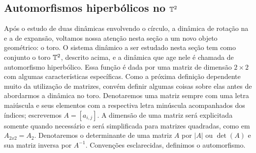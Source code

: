 \begin{comment}
Vamos agora mostrar que vale a relação comutativa $\phi \circ f = \sigma \circ \phi$. Seja $x \in F$ e $\phi(x) = (x_n)_{n \in \Z}$. Nesse caso, sabemos que $x \in R_{(x_n)_{n \in \Z}}$. Aplicando $f$ a $R_{(x_n)}$, temos
	\begin{align*}
	f(R_{(x_n)_{n \in \Z}}) &= f\left( \bigcap_{i \in \Z}f^i(R_{x_i})\right) \\
				&= \bigcap_{i \in \Z}f^{i+1}(R_{x_i}) \\
				&= \bigcap_{i \in \Z}f^i(R_{x_{i-1}}) \\
				&= R_{(x_{n-1})_{n \in \Z}}.
	\end{align*}
Mas isso implica que $f(x) \in R_{(x_{n-1})_{n \in \Z}}$ e, portanto, pela bijetividade de $\phi$, temos $\phi(f(x)) = (x_{n-1})_{n \in \Z}$. Por outro lado, como $\phi(x) = (x_n)_{n \in \Z}$, temos $\sigma(\phi(x)) = (x_{n-1})_{n \in \Z}$. Logo $\phi \circ f = \sigma \circ \phi$.
\end{proof}

\end{comment}

\subsection{Automorfismos hiperbólicos no \texorpdfstring{$\mathbb{T}^2$}{toro 2-dimensional}}

Após o estudo de duas dinâmicas envolvendo o círculo, a dinâmica de rotação na  e a de expansão, voltamos nossa atenção nesta seção a um novo objeto geométrico: o toro. O sistema dinâmico a ser estudado nesta seção tem como conjunto o toro $\mathbb{T}^2$, descrito acima, e a dinâmica que age nele é chamada de automorfismo hiperbólico. Essa função é dada por uma matriz de dimensão $2 \times 2$ com algumas características específicas. Como a próxima definição dependente muito da utilização de matrizes, convém definir algumas coisas sobre elas antes de abordarmos a dinâmica no toro. Denotaremos uma matriz sempre com uma letra maiúscula e seus elementos com a respectiva letra minúscula acompanhados dos índices; escrevemos $A = [a_{i,j}]$. A dimensão de uma matriz será explicitada somente quando necessário e será simplificada para matrizes quadradas, como em $A_{2x2}=A_{2}$. Denotaremos o determinante de uma matriz $A$ por $|A|$ ou $\det(A)$ e sua matriz inversa por $A^{-1}$. Convenções esclarecidas, definimos o automorfismo.

